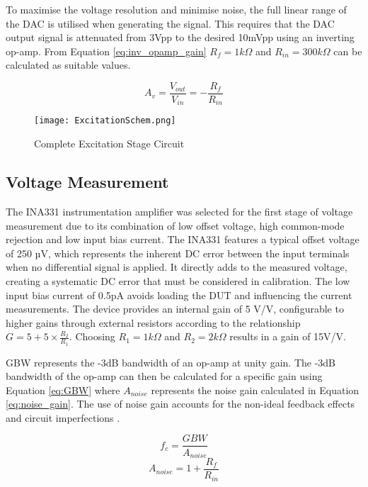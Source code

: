 To maximise the voltage resolution and minimise noise, the full linear range of the DAC is utilised when generating the signal. This requires that the DAC output signal is attenuated from 3Vpp to the desired 10mVpp using an inverting op-amp. From Equation \ref{eq:inv_opamp_gain} $R_{f}=1k\Omega$ and $R_{in}=300k\Omega$ can be calculated as suitable values.

\begin{equation}
    A_v = \frac{V_{out}}{V_{in}} = -\frac{R_f}{R_{in}}
    \label{eq:inv_opamp_gain}
\end{equation}

\begin{figure}[]
    \centering
    \texttt{[image: ExcitationSchem.png]}
    \caption{Complete Excitation Stage Circuit}
    \label{fig:excitation_stage_circuit}
\end{figure}

\subsection{Voltage Measurement}
The INA331 instrumentation amplifier was selected for the first stage of voltage measurement due to its combination of low offset voltage, high common-mode rejection and low input bias current. The INA331 features a typical offset voltage of 250 µV, which represents the inherent DC error between the input terminals when no differential signal is applied. It directly adds to the measured voltage, creating a systematic DC error that must be considered in calibration. The low input bias current of 0.5pA avoids loading the DUT and influencing the current measurements. The device provides an internal gain of 5 V/V, configurable to higher gains through external resistors according to the relationship $G = 5 + 5\times \frac{R_2}{R_1}$. Choosing $R_1=1k\Omega$ and $R_2=2k\Omega$ results in a gain of 15V/V. 

\Ac{GBW} represents the -3dB bandwidth of an op-amp at unity gain. The -3dB bandwidth of the op-amp can then be calculated for a specific gain using Equation \ref{eq:GBW} where $A_{noise}$ represents the noise gain calculated in Equation \ref{eq:noise_gain}. The use of noise gain accounts for the non-ideal feedback effects and circuit imperfections \cite{fiore53GainBandwidthProduct2018}.

\begin{equation}
    f_c = \frac{GBW}{A_{noise}}
    \label{eq:GBW}
\end{equation}
\begin{equation}
    A_{noise} = 1 + \frac{R_f}{R_{in}}
    \label{eq:noise_gain}
\end{equation}

